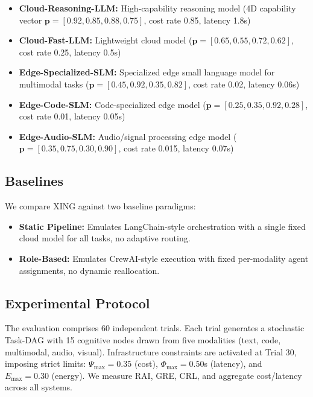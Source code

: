 \documentclass[conference]{IEEEtran}
\begin{document}
\begin{itemize}
    \item \textbf{Cloud-Reasoning-LLM:} High-capability reasoning model (4D capability vector $\mathbf{p}=[0.92,0.85,0.88,0.75]$, cost rate 0.85, latency 1.8s)
    \item \textbf{Cloud-Fast-LLM:} Lightweight cloud model ($\mathbf{p}=[0.65,0.55,0.72,0.62]$, cost rate 0.25, latency 0.5s)
    \item \textbf{Edge-Specialized-SLM:} Specialized edge small language model for multimodal tasks ($\mathbf{p}=[0.45,0.92,0.35,0.82]$, cost rate 0.02, latency 0.06s)
    \item \textbf{Edge-Code-SLM:} Code-specialized edge model ($\mathbf{p}=[0.25,0.35,0.92,0.28]$, cost rate 0.01, latency 0.05s)
    \item \textbf{Edge-Audio-SLM:} Audio/signal processing edge model ($\mathbf{p}=[0.35,0.75,0.30,0.90]$, cost rate 0.015, latency 0.07s)
\end{itemize}

\subsection{Baselines}

We compare XING against two baseline paradigms:
\begin{itemize}
    \item \textbf{Static Pipeline:} Emulates LangChain-style orchestration with a single fixed cloud model for all tasks, no adaptive routing.
    \item \textbf{Role-Based:} Emulates CrewAI-style execution with fixed per-modality agent assignments, no dynamic reallocation.
\end{itemize}

\subsection{Experimental Protocol}

The evaluation comprises 60 independent trials. Each trial generates a stochastic Task-DAG with 15 cognitive nodes drawn from five modalities (text, code, multimodal, audio, visual). Infrastructure constraints are activated at Trial 30, imposing strict limits: $\Psi_{\max}=0.35$ (cost), $\Phi_{\max}=0.50$s (latency), and $E_{\max}=0.30$ (energy). We measure RAI, GRE, CRL, and aggregate cost/latency across all systems.

\end{document}
